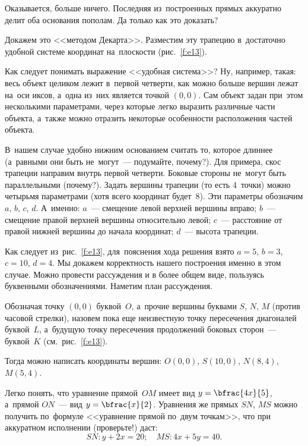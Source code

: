 Оказывается, больше ничего. Последняя из~построенных прямых аккуратно делит оба основания пополам.
Да только как это доказать?

Докажем это <<методом Декарта>>. Разместим эту трапецию в~достаточно удобной системе
координат на~плоскости (рис.~\ref{f:e13}).



Как следует понимать выражение <<удобная система>>? Ну, например, такая: весь объект целиком лежит
в~первой четверти, как можно больше вершин лежат на~оси иксов, а~одна из~них является точкой $(0,0)$.
Сам объект задан при~этом несколькими параметрами, через которые легко выразить различные части
объекта, а~также можно отразить некоторые особенности расположения частей объекта.

В~нашем случае удобно нижним основанием считать то, которое длиннее (а~равными они быть
не~могут~--- подумайте, почему?). Для примера, скос трапеции направим внутрь первой четверти.
Боковые стороны не~могут быть параллельными (почему?). Задать вершины трапеции (то есть 4~точки) можно четырьмя параметрами (хотя всего координат будет~8). Эти параметры обозначим $a$, $b$, $c$, $d$. А~именно: $a$~--- смещение левой верхней вершины вправо;
$b$~--- смещение правой верхней вершины относительно левой;
$c$~--- расстояние от правой нижней вершины до начала координат;
$d$~--- высота трапеции.

Как следует из~рис.~\ref{f:e13}, для~пояснения хода решения взято $a=5$, $b=3$, $c=10$, $d=4$.
Мы докажем корректность нашего построения именно в этом случае. Можно провести рассуждения
и в более общем виде, пользуясь буквенными обозначениями. Наметим план рассуждения.

Обозначая точку $(0, 0)$ буквой~$O$, а~прочие вершины буквами $S$, $N$, $M$ (против часовой
стрелки), назовем пока еще неизвестную точку пересечения диагоналей буквой~$L$, а~будущую
точку пересечения продолжений боковых сторон~--- буквой~$K$ (см.~рис.~\ref{f:e13}).

Тогда можно написать координаты вершин: $O(0, 0)$, $S(10, 0)$, $N(8,4)$, $M(5,4)$.

Легко понять, что уравнение прямой~$OM$ имеет вид $y = \bfrac{4x}{5}$, а~прямой $ON$~---
вид $y = \bfrac{x}{2}$. Уравнения же прямых $SN$, $MS$ можно получить по~формуле
<<уравнение прямой по~двум точкам>>, что при аккуратном исполнении (проверьте!) даст:
\begin{equation} %
\label{2-1-2}
SN:
y+2x=20;\quad
MS: 4x + 5y = 40.
\end{equation}

